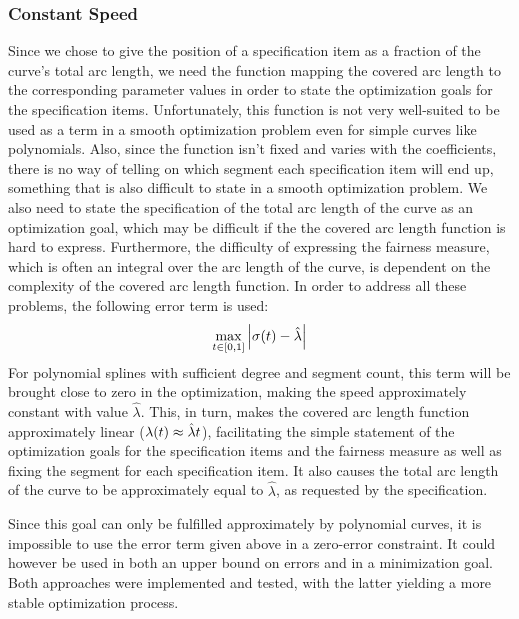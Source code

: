 \documentclass[a4paper]{article}
\begin{document}
			\subsubsection{Constant Speed}
			\label{section:constant_speed}

				Since we chose to give the position of a specification item as a fraction of the curve's total arc length, we need the function mapping the covered arc length to the corresponding parameter values in order to state the optimization goals for the specification items. Unfortunately, this function is not very well-suited to be used as a term in a smooth optimization problem even for simple curves like polynomials. Also, since the function isn't fixed and varies with the coefficients, there is no way of telling on which segment each specification item will end up, something that is also difficult to state in a smooth optimization problem. We also need to state the specification of the total arc length of the curve as an optimization goal, which may be difficult if the the covered arc length function is hard to express. Furthermore, the difficulty of expressing the fairness measure, which is often an integral over the arc length of the curve, is dependent on the complexity of the covered arc length function. In order to address all these problems, the following error term is used:
				\begin{equation*}
					\max_{t \in \left[ 0,1 \right]} \left| \sigma\!\left( t \right) - \hat{\lambda} \right|
				\end{equation*}
				For polynomial splines with sufficient degree and segment count, this term will be brought close to zero in the optimization, making the speed approximately constant with value \(\hat{\lambda}\). This, in turn, makes the covered arc length function approximately linear (\(\lambda\!\left( t \right) \approx \hat{\lambda}t\)), facilitating the simple statement of the optimization goals for the specification items and the fairness measure as well as fixing the segment for each specification item. It also causes the total arc length of the curve to be approximately equal to \(\hat{\lambda}\), as requested by the specification.

				Since this goal can only be fulfilled approximately by polynomial curves, it is impossible to use the error term given above in a zero-error constraint. It could however be used in both an upper bound on errors and in a minimization goal. Both approaches were implemented and tested, with the latter yielding a more stable optimization process.
\end{document}
